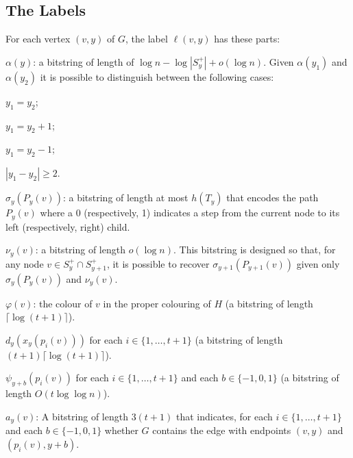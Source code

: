 \documentclass{patmorin}
\begin{document}
\subsection{The Labels}

For each vertex $(v,y)$ of $G$, the label $\ell(v,y)$ has these parts:

\begin{compactenum}[(L1)]
    \item $\alpha(y)$: a bitstring of length of $\log n-\log |S^+_y|+o(\log n)$.  Given $\alpha(y_1)$ and $\alpha(y_2)$ it is possible to distinguish between the following cases:
    \begin{inparaenum}
        \item $y_1=y_2$;
        \item $y_1=y_2+1$;
        \item $y_1=y_2-1$;
        \item $|y_1-y_2|\ge 2$.
    \end{inparaenum}

    \item $\sigma_y(P_y(v))$: a bitstring of length at most $h(T_y)$ that encodes the path $P_y(v)$ where a 0 (respectively, 1) indicates a step from the current node to its left (respectively, right) child.

    \item $\nu_y(v)$: a bitstring of length $o(\log n)$.  This bitstring is designed so that, for any node $v\in S^+_y\cap S^+_{y+1}$, it is possible to recover $\sigma_{y+1}(P_{y+1}(v))$ given only $\sigma_y(P_y(v))$ and $\nu_y(v)$.

    \item $\varphi(v)$: the colour of $v$ in the proper colouring of $H$ (a bitstring of length $\lceil\log(t+1)\rceil$).

    \item $d_y(x_y(p_i(v)))$ for each $i\in\{1,\ldots,t+1\}$ (a bitstring of length $(t+1)\lceil\log(t+1)\rceil$).

    \item $\psi_{y+b}(p_i(v))$ for each $i\in\{1,\ldots,t+1\}$ and each $b\in\{-1,0,1\}$ (a bitstring of length $O(t\log\log n)$).\label{psi}

    \item $a_y(v)$: A bitstring of length $3(t+1)$ that indicates, for each $i\in\{1,\ldots,t+1\}$ and each $b\in\{-1,0,1\}$ whether $G$ contains the edge with endpoints $(v,y)$ and $(p_i(v),y+b)$.
\end{compactenum}
\end{document}
